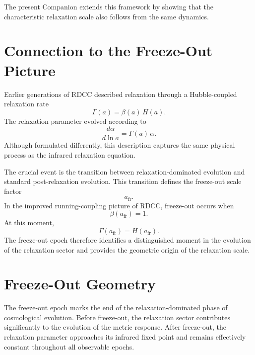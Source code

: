 \documentclass[11pt,a4paper]{article}
\begin{document}
The present Companion extends this framework by showing that the characteristic
relaxation scale also follows from the same dynamics.

\section{Connection to the Freeze-Out Picture}

Earlier generations of RDCC described relaxation through a Hubble-coupled
relaxation rate
\begin{equation}
  \Gamma(a)
  =
  \beta(a)\, H(a).
\end{equation}
The relaxation parameter evolved according to
\begin{equation}
  \frac{d\alpha}{d\ln a}
  =
  \Gamma(a)\, \alpha.
\end{equation}
Although formulated differently, this description captures the same physical
process as the infrared relaxation equation.

The crucial event is the transition between relaxation-dominated evolution and
standard post-relaxation evolution. This transition defines the freeze-out
scale factor
\begin{equation}
  a_{\mathrm{fr}}.
\end{equation}
In the improved running-coupling picture of RDCC, freeze-out occurs when
\begin{equation}
  \beta(a_{\mathrm{fr}})
  =
  1.
\end{equation}
At this moment,
\begin{equation}
  \Gamma(a_{\mathrm{fr}})
  =
  H(a_{\mathrm{fr}}).
\end{equation}
The freeze-out epoch therefore identifies a distinguished moment in the
evolution of the relaxation sector and provides the geometric origin of the
relaxation scale.
\section{Freeze-Out Geometry}

The freeze-out epoch marks the end of the relaxation-dominated phase of
cosmological evolution. Before freeze-out, the relaxation sector contributes
significantly to the evolution of the metric response. After freeze-out, the
relaxation parameter approaches its infrared fixed point and remains
effectively constant throughout all observable epochs.
\end{document}
